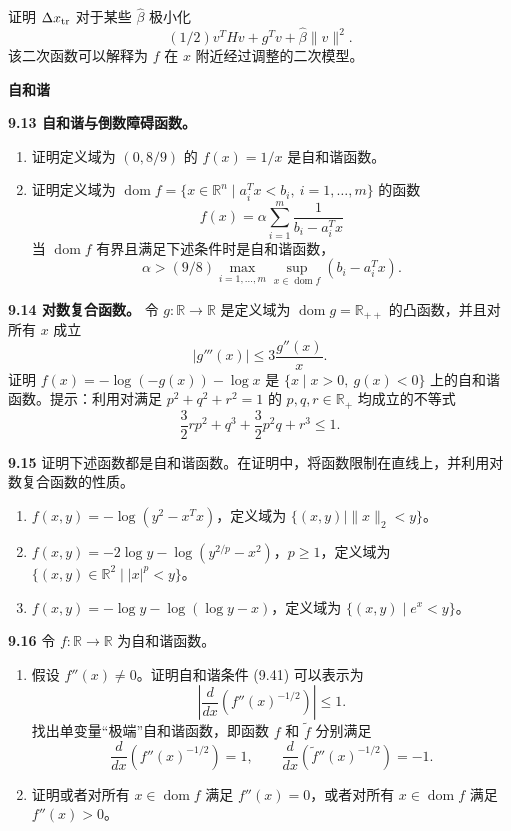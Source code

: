 \documentclass[UTF8, 12pt, fontset=fandol, oneside]{ctexart}
\begin{document}
证明 $\Delta x_{\rm tr}$ 对于某些 $\hat{\beta}$ 极小化
\[
(1/2)v^THv+g^Tv+\hat{\beta}\|v\|^2.
\]
该二次函数可以解释为 $f$ 在 $x$ 附近经过调整的二次模型。

\noindent\textbf{自和谐}

\noindent\textbf{9.13 自和谐与倒数障碍函数。}
\begin{enumerate}
\item[(a)] 证明定义域为 $(0,8/9)$ 的 $f(x)=1/x$ 是自和谐函数。
\item[(b)] 证明定义域为 $\operatorname{dom} f=\{x\in\mathbb{R}^n\mid a_i^Tx<b_i,\ i=1,\ldots,m\}$ 的函数
\[
f(x)=\alpha\sum_{i=1}^m\frac{1}{b_i-a_i^Tx}
\]
当 $\operatorname{dom} f$ 有界且满足下述条件时是自和谐函数，
\[
\alpha>(9/8)\max_{i=1,\ldots,m}\sup_{x\in\operatorname{dom} f}(b_i-a_i^Tx).
\]
\end{enumerate}

\noindent\textbf{9.14 对数复合函数。}\quad
令 $g:\mathbb{R}\to\mathbb{R}$ 是定义域为 $\operatorname{dom} g=\mathbb{R}_{++}$ 的凸函数，并且对所有 $x$ 成立
\[
|g'''(x)|\leq3\frac{g''(x)}{x}.
\]
证明 $f(x)=-\log(-g(x))-\log x$ 是 $\{x\mid x>0,\ g(x)<0\}$ 上的自和谐函数。提示：利用对满足 $p^2+q^2+r^2=1$ 的 $p,q,r\in\mathbb{R}_+$ 均成立的不等式
\[
\frac{3}{2}rp^2+q^3+\frac{3}{2}p^2q+r^3\leq1.
\]

\noindent\textbf{9.15}\quad
证明下述函数都是自和谐函数。在证明中，将函数限制在直线上，并利用对数复合函数的性质。
\begin{enumerate}
\item[(a)] $f(x,y)=-\log(y^2-x^Tx)$，定义域为 $\{(x,y)\mid \|x\|_2<y\}$。
\item[(b)] $f(x,y)=-2\log y-\log(y^{2/p}-x^2)$，$p\geq1$，定义域为 $\{(x,y)\in\mathbb{R}^2\mid |x|^p<y\}$。
\item[(c)] $f(x,y)=-\log y-\log(\log y-x)$，定义域为 $\{(x,y)\mid e^x<y\}$。
\end{enumerate}

\noindent\textbf{9.16}\quad
令 $f:\mathbb{R}\to\mathbb{R}$ 为自和谐函数。
\begin{enumerate}
\item[(a)] 假设 $f''(x)\neq0$。证明自和谐条件 (9.41) 可以表示为
\[
\left|\frac{d}{dx}\left(f''(x)^{-1/2}\right)\right|\leq1.
\]
找出单变量``极端''自和谐函数，即函数 $f$ 和 $\tilde f$ 分别满足
\[
\frac{d}{dx}\left(f''(x)^{-1/2}\right)=1,\qquad
\frac{d}{dx}\left(\tilde f''(x)^{-1/2}\right)=-1.
\]
\item[(b)] 证明或者对所有 $x\in\operatorname{dom} f$ 满足 $f''(x)=0$，或者对所有 $x\in\operatorname{dom} f$ 满足 $f''(x)>0$。
\end{enumerate}
\end{document}
